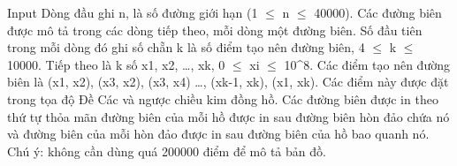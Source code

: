 Input
Dòng đầu ghi n, là số đường giới hạn (1  $\le$  n  $\le$  40000).  Các đường biên được mô tả trong các dòng tiếp theo, mỗi dòng một đường biên. Số đầu tiên trong mỗi dòng đó ghi số chẵn k là số điểm tạo nên đường biên, 4  $\le$  k  $\le$  10000. Tiếp theo là k số x1, x2, …, xk, 0  $\le$  xi  $\le$  10^8. Các điểm tạo nên đường biên là (x1, x2), (x3, x2), (x3, x4) …, (xk-1, xk), (x1, xk). Các điểm này được đặt trong tọa độ Đề Các và ngược chiều kim đồng hồ. Các đường biên được in theo thứ tự thỏa mãn đường biên của mỗi hồ được in sau đường biên hòn đảo chứa nó và đường biên của mỗi hòn đảo được in sau đường biên của hồ bao quanh nó. Chú ý: không cần dùng quá 200000 điểm để mô tả bản đồ.